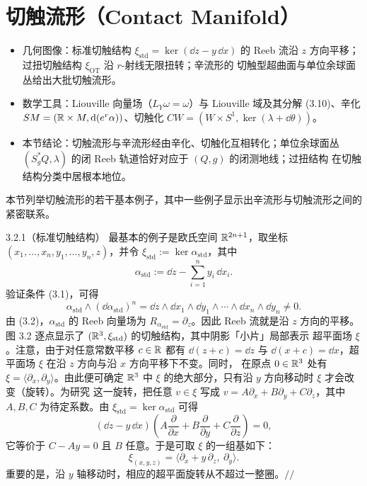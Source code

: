 \section{切触流形（Contact Manifold）}

\begin{keytakeaways}
\begin{itemize}
  \item 几何图像：标准切触结构 $\xi_{\mathrm{std}}=\ker(\dd z-y\,\dd x)$ 的 Reeb 流沿
        $z$ 方向平移；过扭切触结构 $\xi_{\mathrm{OT}}$ 沿 $r$-射线无限扭转；辛流形的
        切触型超曲面与单位余球面丛给出大批切触流形。
  \item 数学工具：Liouville 向量场（$L_Y\omega=\omega$）与 Liouville 域及其分解
        (3.10)、辛化 $SM=(\mathbb{R}\times M,\mathrm{d}(e^r\alpha))$、切触化
        $CW=(W\times S^1,\ker(\lambda+\dd\theta))$。
  \item 本节结论：切触流形与辛流形经由辛化、切触化互相转化；单位余球面丛
        $(S^*_gQ,\lambda)$ 的闭 Reeb 轨道恰好对应于 $(Q,g)$ 的闭测地线；过扭结构
        在切触结构分类中居根本地位。
\end{itemize}
\end{keytakeaways}

本节列举切触流形的若干基本例子，其中一些例子显示出辛流形与切触流形之间的紧密联系。

\begin{wexam}{3.2.1}（标准切触结构）
最基本的例子是欧氏空间 $\mathbb{R}^{2n+1}$，取坐标
$(x_1,\dots,x_n,y_1,\dots,y_n,z)$，并令
$\xi_{\mathrm{std}}:=\ker\alpha_{\mathrm{std}}$，其中
\begin{equation}\tag{3.3}
  \alpha_{\mathrm{std}}:=\dd z-\sum_{i=1}^n y_i\,\dd x_i .
\end{equation}
验证条件 (3.1)，可得
\[
  \alpha_{\mathrm{std}}\wedge(\dd\alpha_{\mathrm{std}})^n
  =\dd z\wedge\dd x_1\wedge\dd y_1\wedge\cdots\wedge\dd x_n
  \wedge\dd y_n\neq0 .
\]
由 (3.2)，$\alpha_{\mathrm{std}}$ 的 Reeb 向量场为
$R_{\alpha_{\mathrm{std}}}=\partial_z$。因此 Reeb 流就是沿 $z$ 方向的平移。图 3.2
逐点显示了 $(\mathbb{R}^3,\xi_{\mathrm{std}})$ 的切触结构，其中阴影「小片」局部表示
超平面场 $\xi$。注意，由于对任意常数平移 $c\in\mathbb{R}$ 都有 $\dd(z+c)=\dd z$ 与
$\dd(x+c)=\dd x$，超平面场 $\xi$ 在沿 $z$ 方向与沿 $x$ 方向平移下不变。同时，
在原点 $0\in\mathbb{R}^3$ 处有 $\xi=\langle\partial_x,\partial_y\rangle$。由此便可确定
$\mathbb{R}^3$ 中 $\xi$ 的绝大部分，只有沿 $y$ 方向移动时 $\xi$ 才会改变（旋转）。为研究
这一旋转，把任意 $v\in\xi$ 写成 $v=A\partial_x+B\partial_y+C\partial_z$，其中
$A,B,C$ 为待定系数。由 $\xi_{\mathrm{std}}=\ker\alpha_{\mathrm{std}}$ 可得
\[
  (\dd z-y\,\dd x)\left(A\frac{\partial}{\partial x}
  +B\frac{\partial}{\partial y}+C\frac{\partial}{\partial z}\right)=0,
\]
它等价于 $C-Ay=0$ 且 $B$ 任意。于是可取 $\xi$ 的一组基如下：
\[
  \xi_{(x,y,z)}=\bigl\langle\partial_x+y\,\partial_z,\ \partial_y\bigr\rangle .
\]
重要的是，沿 $y$ 轴移动时，相应的超平面旋转从不超过一整圈。\hfill$//$
\end{wexam}

